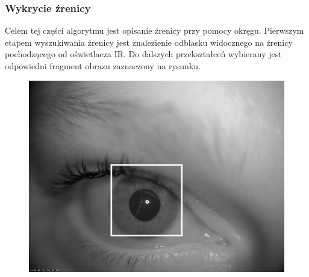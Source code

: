 \documentclass{beamer}
\begin{document}
\begin{frame}
\frametitle{Wykrycie źrenicy}
Celem tej części algorytmu jest opisanie źrenicy przy pomocy okręgu. Pierwszym etapem wyszukiwania źrenicy jest znalezienie odblasku widocznego na źrenicy pochodzącego od oświetlacza IR. Do dalszych przekształceń wybierany jest odpowiedni fragment obrazu zaznaczony na rysunku.
\begin{figure}
\begin{center}
\includegraphics[scale=0.07]{obszar.jpg}
\end{center}
\end{figure}
\end{frame}

\end{document}
